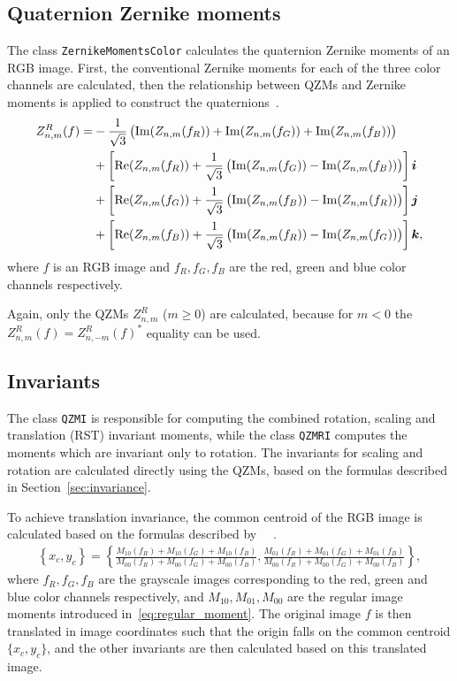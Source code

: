 \subsection{Quaternion Zernike moments}
The class \texttt{ZernikeMomentsColor} calculates the quaternion Zernike moments of an RGB image. First, the conventional Zernike moments for each of the three color channels are calculated, then the relationship between QZMs and Zernike moments is applied to construct the quaternions~\cite{qzmi}.
\begin{gather*}
    \begin{split}
        Z_{n,m}^R(f) = &-\frac{1}{\sqrt{3}}\left( \operatorname{Im}(Z_{n,m}(f_R)) + \operatorname{Im}(Z_{n,m}(f_G)) + \operatorname{Im}(Z_{n,m}(f_B)) \right)\\
        &+\left[\operatorname{Re}(Z_{n,m}(f_R)) + \frac{1}{\sqrt{3}}\left(\operatorname{Im}(Z_{n,m}(f_G)) - \operatorname{Im}(Z_{n,m}(f_B))\right)\right]\bm{i}\\
        &+\left[\operatorname{Re}(Z_{n,m}(f_G)) + \frac{1}{\sqrt{3}}\left(\operatorname{Im}(Z_{n,m}(f_B)) - \operatorname{Im}(Z_{n,m}(f_R))\right)\right]\bm{j}\\
        &+\left[\operatorname{Re}(Z_{n,m}(f_B)) + \frac{1}{\sqrt{3}}\left(\operatorname{Im}(Z_{n,m}(f_R)) - \operatorname{Im}(Z_{n,m}(f_G))\right)\right]\bm{k},\\
    \end{split}
\end{gather*}
where $f$ is an RGB image and $f_R, f_G, f_B$ are the red, green and blue color channels respectively.

Again, only the QZMs $Z_{n,m}^R$ ($m \geq 0$) are calculated, because for $m < 0$ the $Z_{n,m}^R(f) = Z_{n,-m}^R(f)^{*}$ equality can be used.

\subsection{Invariants}
The class \texttt{QZMI} is responsible for computing the combined rotation, scaling and translation (RST) invariant moments, while the class \texttt{QZMRI} computes the moments which are invariant only to rotation.
The invariants for scaling and rotation are calculated directly using the QZMs, based on the formulas described in Section~\ref{sec:invariance}.

To achieve translation invariance, the common centroid of the RGB image is calculated based on the formulas described by ~\citeauthor{affine_color}~\cite{affine_color}.
\begin{gather*}
    \left\{x_c,y_c\right\} = \left\{\frac{M_{10}(f_R)+M_{10}(f_G)+M_{10}(f_B)}{M_{00}(f_R)+M_{00}(f_G)+M_{00}(f_B)}, \frac{M_{01}(f_R)+M_{01}(f_G)+M_{01}(f_B)}{M_{00}(f_R)+M_{00}(f_G)+M_{00}(f_B)}\right\},
\end{gather*}
where $f_R, f_G, f_B$ are the grayscale images corresponding to the red, green and blue color channels respectively, and $M_{10}, M_{01}, M_{00}$ are the regular image moments introduced in~\eqref{eq:regular_moment}.
The original image $f$ is then translated in image coordinates such that the origin falls on the common centroid $\{x_c,y_c\}$, and the other invariants are then calculated based on this translated image.


